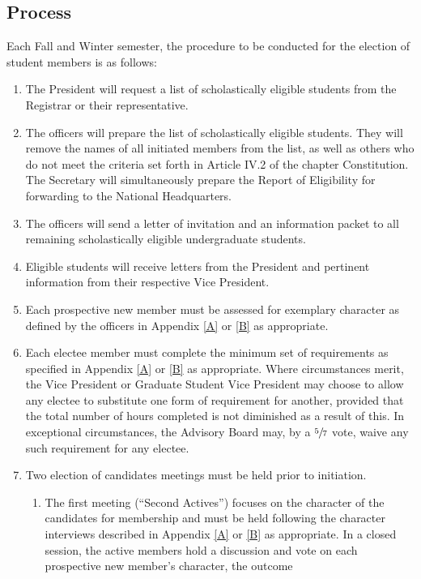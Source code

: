 \subsection{Process} \label{VI.1}

Each Fall and Winter semester, the procedure to be conducted
for the election of student members is as follows:
\begin{enumerate}
    \item The President will request a list of scholastically eligible students from the Registrar
or their representative.
    \item The officers will prepare the list of scholastically eligible students. They will remove
the names of all initiated members from the list, as well as others who do not meet
the criteria set forth in Article IV.2 of the chapter Constitution. The Secretary will simultaneously
prepare the Report of Eligibility for forwarding to the National Headquarters.
    \item The officers will send a letter of invitation and an information packet to all remaining
scholastically eligible undergraduate students.
    \item Eligible students will receive letters from the President and pertinent information
from their respective Vice President.
    \item Each prospective new member must be assessed for exemplary character as defined
by the officers in Appendix \ref{A} or \ref{B} as appropriate.\
    \item Each electee member must complete the minimum set of requirements as specified
in Appendix \ref{A} or \ref{B} as appropriate. Where circumstances merit, the Vice President or
Graduate Student Vice President may choose to allow any electee to substitute one
form of requirement for another, provided that the total number of hours completed
is not diminished as a result of this. In exceptional circumstances, the Advisory Board
may, by a $\sfrac{5}{7}$ vote, waive any such requirement for any electee.
    \item Two election of candidates meetings must be held prior to initiation.
    \begin{enumerate}
        \item The first meeting (“Second Actives”) focuses on the character of the candidates
for membership and must be held following the character interviews described
in Appendix \ref{A} or \ref{B} as appropriate. In a closed session, the active members hold
a discussion and vote on each prospective new member’s character, the outcome

\end{enumerate}
\end{enumerate}
